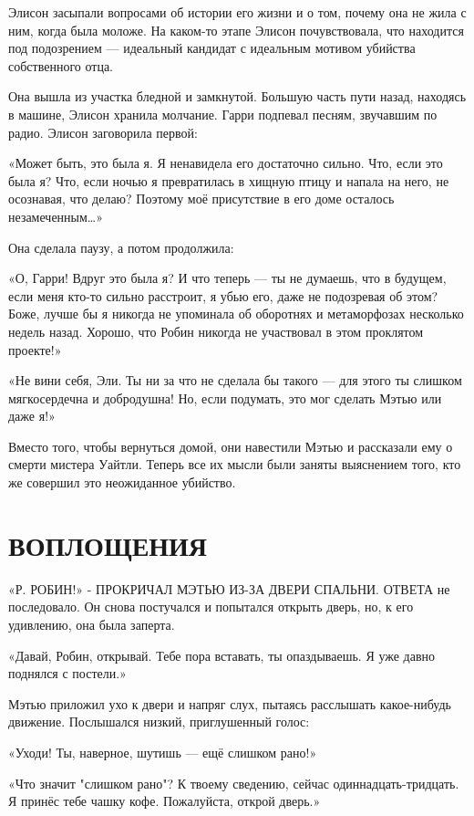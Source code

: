\documentclass[a5paper, 9pt,
final, openany, twoside=true]{memoir}
\begin{document}
Элисон засыпали вопросами об истории его жизни и о том, почему она не жила с ним, когда была моложе. На каком-то этапе Элисон почувствовала, что находится под подозрением — идеальный кандидат с идеальным мотивом убийства собственного отца.\bigskip

Она вышла из участка бледной и замкнутой. Большую часть пути назад, находясь в машине, Элисон хранила молчание. Гарри подпевал песням, звучавшим по радио. Элисон заговорила первой:

«Может быть, это была я. Я ненавидела его достаточно сильно. Что, если это была я? Что, если ночью я превратилась в хищную птицу и напала на него, не осознавая, что делаю? Поэтому моё присутствие в его доме осталось незамеченным…»

Она сделала паузу, а потом продолжила:

«О, Гарри! Вдруг это была я? И что теперь — ты не думаешь, что в будущем, если меня кто-то сильно расстроит, я убью его, даже не подозревая об этом? Боже, лучше бы я никогда не упоминала об оборотнях и метаморфозах несколько недель назад. Хорошо, что Робин никогда не участвовал в этом проклятом проекте!»

«Не вини себя, Эли. Ты ни за что не сделала бы такого — для этого ты слишком мягкосердечна и добродушна! Но, если подумать, это мог сделать Мэтью или даже я!»

Вместо того, чтобы вернуться домой, они навестили Мэтью и рассказали ему о смерти мистера Уайтли. Теперь все их мысли были заняты выяснением того, кто же совершил это неожиданное убийство.

\chapter{ВОПЛОЩЕНИЯ}
«Р{. РОБИН!» - ПРОКРИЧАЛ МЭТЬЮ ИЗ-ЗА ДВЕРИ СПАЛЬНИ. ОТВЕТА} не последовало. Он снова постучался и попытался открыть дверь, но, к его удивлению, она была заперта.

«Давай, Робин, открывай. Тебе пора вставать, ты опаздываешь. Я уже давно поднялся с постели.»

Мэтью приложил ухо к двери и напряг слух, пытаясь расслышать какое-нибудь движение. Послышался низкий, приглушенный голос:

«Уходи! Ты, наверное, шутишь — ещё слишком рано!»

«Что значит "слишком рано"? К твоему сведению, сейчас одиннадцать-тридцать. Я принёс тебе чашку кофе. Пожалуйста, открой дверь.»
\end{document}
